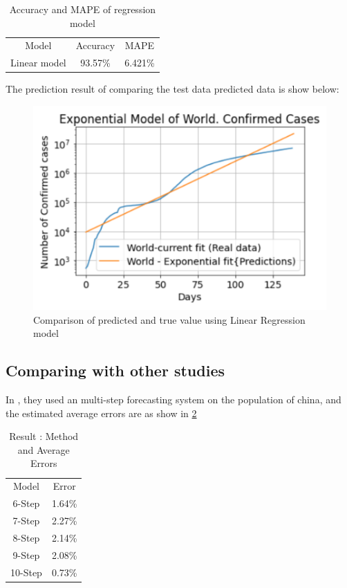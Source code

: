 \begin{table}[ht!]
	\centering
	\caption{Accuracy and MAPE of regression model}
	\begin{tabular}{c c c}
		Model & Accuracy & MAPE \\
		Linear model & 93.57\% & 6.421\%
	\end{tabular}
	\label{table:linear}
\end{table}

The prediction result of comparing the test data predicted data is show below:
\begin{figure}[ht!]
	\centering
	\includegraphics[scale=0.5]{images/linear_graph.png}
	\caption{Comparison of predicted and true value using Linear Regression model}
	\label{fig:linear_graph}
\end{figure}

\pagebreak

\subsection{Comparing with other studies}
%
In \cite{hu2020artificial}, they used an multi-step forecasting system on
the population of china, and the estimated average errors are as show in
\ref{table:three}

\begin{table}[ht!]
	\centering
	\caption{Result \cite{hu2020artificial}: Method and Average Errors}
	\begin{tabular}{c c }
		Model & Error  \\
		6-Step & 1.64\% \\
		7-Step & 2.27\% \\
		8-Step & 2.14\% \\
		9-Step & 2.08\% \\
		10-Step & 0.73\%
	\end{tabular}
	\label{table:three}
\end{table}


